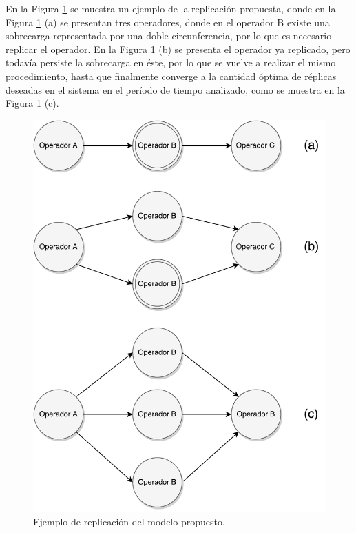 En la Figura \ref{fig:ejReplicacion} se muestra un ejemplo de la replicación propuesta, donde en la Figura \ref{fig:ejReplicacion} (a) se presentan tres operadores, donde en el operador B existe una sobrecarga representada por una doble circunferencia, por lo que es necesario replicar el operador. En la Figura \ref{fig:ejReplicacion} (b) se presenta el operador ya replicado, pero todavía persiste la sobrecarga en éste, por lo que se vuelve a realizar el mismo procedimiento, hasta que finalmente converge a la cantidad óptima de réplicas deseadas en el sistema en el período de tiempo analizado, como se muestra en la Figura \ref{fig:ejReplicacion} (c).

\begin{figure}[!hb]
	\centering
		\includegraphics[scale=0.6]{images/EjReplicacion.pdf}
	\caption{Ejemplo de replicación del modelo propuesto.}
	\label{fig:ejReplicacion}
\end{figure}

